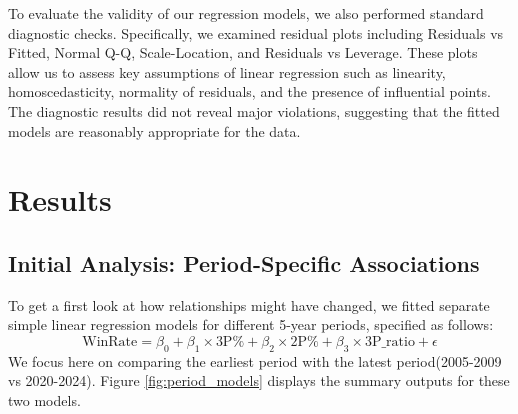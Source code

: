 \documentclass[11pt, a4paper]{article} %
\begin{document}

To evaluate the validity of our regression models, we also performed standard diagnostic checks. Specifically, we examined 
residual plots including Residuals vs Fitted, Normal Q-Q, Scale-Location, and Residuals vs Leverage. These plots allow us to 
assess key assumptions of linear regression such as linearity, homoscedasticity, normality of residuals, and the presence of 
influential points. The diagnostic results did not reveal major violations, suggesting that the fitted models are reasonably 
appropriate for the data.



\section{Results}
\subsection{Initial Analysis: Period-Specific Associations}

To get a first look at how relationships might have changed, we fitted separate simple linear regression models for 
different 5-year periods, specified as follows:
\begin{equation*}
\text{WinRate} = \beta_0 + \beta_1 \times \text{3P\%} + \beta_2 \times \text{2P\%} + \beta_3 \times \text{3P\_ratio} + \epsilon
\end{equation*}
We focus here on comparing the earliest period with the latest period(2005-2009 vs 2020-2024). Figure \ref{fig:period_models} displays the summary outputs 
for these two models.
\end{document}
